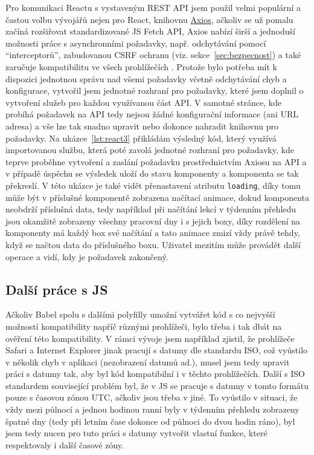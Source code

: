     Pro komunikaci Reactu s vystaveným REST API jsem použil velmi populární a častou volbu vývojářů nejen pro React, knihovnu \href{https://github.com/axios/axios}{Axios}, ačkoliv se už pomalu začíná rozšiřovat standardizované JS Fetch API, Axios nabízí širší a jednoduší možnosti práce s asynchronními požadavky, např. odchytávání pomocí \enquote{interceptorů}, zabudovanou CSRF ochranu (viz. sekce~\ref{sec:bezpecnost}) a také zaručuje kompatibilitu ve všech prohlížečích \cite{axios}. Protože bylo potřeba mít k dispozici jednotnou správu nad všemi požadavky včetně odchytávání chyb a konfigurace, vytvořil jsem jednotné rozhraní pro požadavky, které jsem doplnil o vytvoření služeb pro každou využívanou část API. V samotné stránce, kde probíhá požadavek na API tedy nejsou žádné konfigurační informace (ani URL adresa) a vše lze tak snadno upravit nebo dokonce nahradit knihovnu pro požadavky. Na ukázce~\ref{lst:react3} přikládám výsledný kód, který využívá importovanou službu, která poté zavolá jednotné rozhraní pro požadavky, kde teprve proběhne vytvoření a zaslání požadavku prostřednictvím Axiosu na API a v případě úspěchu se výsledek uloží do stavu komponenty a komponenta se tak překreslí. V této ukázce je také vidět přenastavení atributu \verb|loading|, díky tomu může být v příslušné komponentě zobrazena načítací animace, dokud komponenta neobdrží příslušná data, tedy například při načítání lekcí v týdenním přehledu jsou okamžitě zobrazeny všechny pracovní dny i s jejich boxy, díky rozdělení na komponenty má každý box své načítání a tato animace zmizí vždy právě tehdy, když se načtou data do příslušného boxu. Uživatel mezitím může provádět další operace a vidí, kdy je požadavek zakončený.
    
    \subsection{Další práce s JS}
    Ačkoliv Babel spolu s dalšími polyfilly umožní vytvářet kód s co nejvyšší možností kompatibility napříč různými prohlížeči, bylo třeba i tak dbát na ověření této kompatibility. V rámci vývoje jsem například zjistil, že prohlížeče Safari a Internet Explorer jinak pracují s datumy dle standardu ISO, což vyústilo v několik chyb v aplikaci (nezobrazení datumů ad.), musel jsem tedy upravit práci s datumy tak, aby byl kód kompatibilní i v těchto prohlížečích. Další s ISO standardem související problém byl, že v JS se pracuje s datumy v tomto formátu pouze s časovou zónou UTC, ačkoliv jsou třeba v jiné. To vyústilo v situaci, že vždy mezi půlnocí a jednou hodinou ranní byly v týdenním přehledu zobrazeny špatné dny (tedy při letním čase dokonce od půlnoci do dvou hodin ráno), byl jsem tedy nucen pro tuto práci s datumy vytvořit vlastní funkce, které respektovaly i další časové zóny.
    
